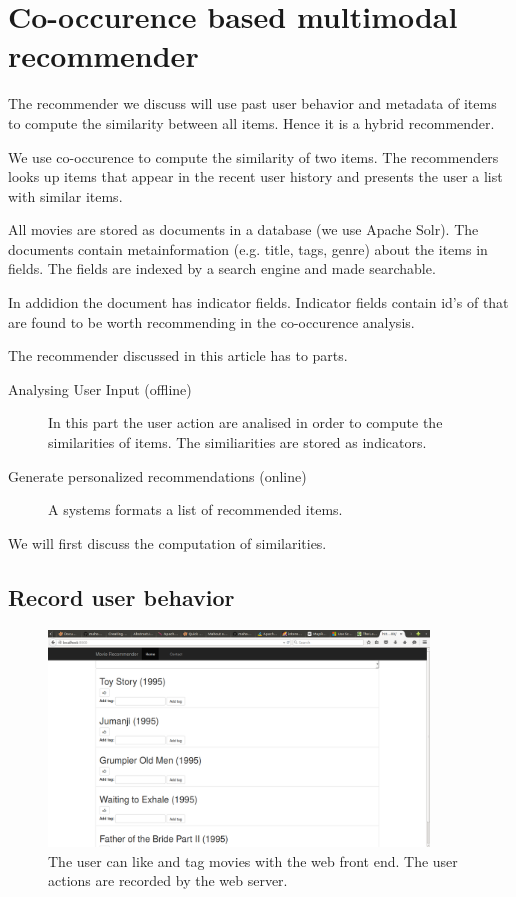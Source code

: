 \section{Co-occurence based multimodal recommender}
\label{sec:design}

The recommender we discuss will use past user behavior and metadata of items to compute the similarity between all items. Hence it is a hybrid recommender.
 
We use co-occurence to compute the similarity of two items. The recommenders looks up items that appear in the recent user history and presents the user a list with similar items.

All movies are stored as documents in a database (we use Apache Solr). The documents contain metainformation (e.g. title, tags, genre) about the items in fields. The fields are indexed by a search engine and made searchable.

In addidion the document has indicator fields. Indicator fields contain id's of that are found to be worth recommending in the co-occurence analysis.

The recommender discussed in this article has to parts.
\begin{description}
\item[Analysing User Input (offline)] In this part the user action are analised in order to compute the similarities of items. The similiarities are stored as indicators.
\item[Generate personalized recommendations (online)] A systems formats a list of recommended items.
\end{description}
We will first discuss the computation of similarities.


\subsection{Record user behavior}
\label{sec:inputdata}

\begin{figure}
  \centering
     \includegraphics[width=0.9\textwidth]{collectinginput}
  \caption{The user can like and tag movies with the web front end. The user actions are recorded by the web server.}
  \label{fig:gui}
\end{figure}

